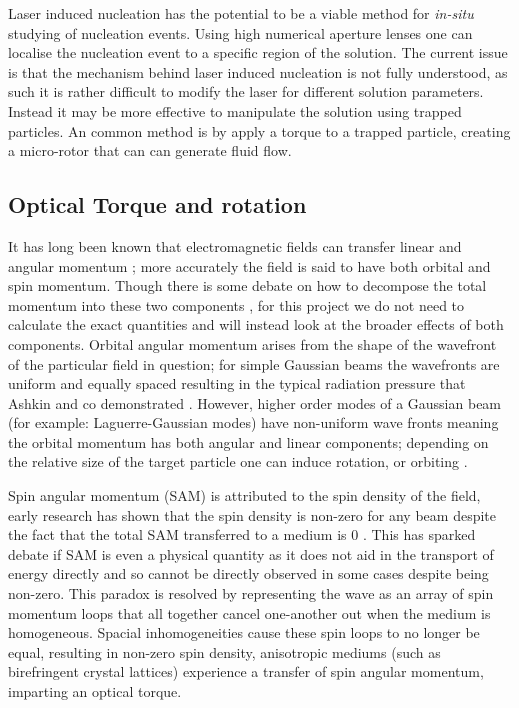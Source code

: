 Laser induced nucleation has the potential to be a viable method 
for \textit{in-situ} studying of nucleation events. Using high 
numerical aperture lenses one can localise the nucleation event 
to a specific region of the solution. The current issue is that 
the mechanism behind laser induced nucleation is not fully 
understood, as such it is rather difficult to modify the laser 
for different solution parameters. Instead it may be more 
effective to manipulate the solution using trapped particles. 
An common method is by apply a torque to a trapped particle, 
creating a micro-rotor that can can generate fluid flow.

\subsection{Optical Torque and rotation}
\label{sec:opt_torque}
It has long been known that electromagnetic fields can transfer linear and
angular momentum \cite{Beth1936MechanicalDA}; more accurately the field 
is said to have both orbital and spin momentum. Though there is some 
debate on how to decompose the total momentum into these two components 
\cite{Bruce2020, Svak2018}, for this project we do not need to calculate 
the exact quantities and will instead look at the broader effects of both 
components. Orbital angular momentum arises from the shape of the wavefront 
of the particular field in question; for simple Gaussian beams the wavefronts 
are uniform and equally spaced resulting in the typical radiation pressure 
that Ashkin and co demonstrated \cite{Ashkin1980}. However, higher order 
modes of a Gaussian beam (for example: Laguerre-Gaussian modes) have 
non-uniform wave fronts meaning the orbital momentum has both angular and
linear components; depending on the relative size of the target particle 
one can induce rotation, or orbiting \cite{Bruce2020, Courtial2000}. 

Spin angular momentum (SAM) is attributed to the spin density of the field, 
early research has shown that the spin density is non-zero for any beam despite
the fact that the total SAM transferred to a medium is 0 \cite{Svak2018, 
Bliokh2014}. This has sparked debate if SAM is even a physical quantity as 
it does not aid in the transport of energy directly \cite{Bliokh2014} and 
so cannot be directly observed in some cases despite being non-zero. This 
paradox is resolved by representing the wave as an array of spin momentum 
loops that all together cancel one-another out when the medium is homogeneous.
Spacial inhomogeneities cause these spin loops to no longer be equal, resulting
in non-zero spin density, anisotropic mediums (such as birefringent crystal 
lattices) experience a transfer of spin angular momentum, imparting an optical
torque.

